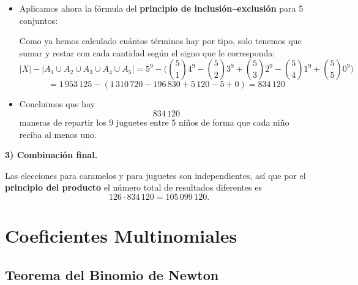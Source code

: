 \documentclass[a4paper,12pt]{article}
\begin{document}
\begin{ejercicio}[title=Ejercicio 37]
\begin{itemize}

  \item Aplicamos ahora la fórmula del \textbf{principio de inclusión–exclusión} para 5 conjuntos:

Como ya hemos calculado cuántos términos hay por tipo, solo tenemos que sumar y restar con cada cantidad según el signo que le corresponda:
  \[
  |X| - |A_1\cup A_2\cup A_3\cup A_4\cup A_5| = 5^9
     - \Bigg(\binom{5}{1}4^9
     - \binom{5}{2}3^9
     + \binom{5}{3}2^9
     - \binom{5}{4}1^9
     + \binom{5}{5}0^9\Bigg)
  \]
  \[
  = 1\,953\,125 - (1\,310\,720 - 196\,830 + 5\,120 - 5 + 0) = 834\,120
  \]

  \item Concluimos que hay
  \[
  834\,120
  \]
  maneras de repartir los 9 juguetes entre 5 niños de forma que cada niño reciba al menos uno.
\end{itemize}

\vspace{0.8em}
\textbf{3) Combinación final.}

Las elecciones para caramelos y para juguetes son independientes, así que por el \textbf{principio del producto} el número total de resultados diferentes es
\[
126 \cdot 834\,120 = \boxed{105\,099\,120}.
\]

\end{ejercicio}

\section{Coeficientes Multinomiales}

\subsection{Teorema del Binomio de Newton}
\end{document}

